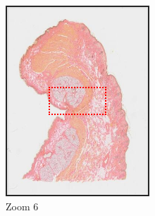 \documentclass[a4paper,11pt]{report}
\numberwithin{figure}{chapter} %
\begin{document}
\begin{itemize}
\begin{figure}[H]
            \begin{subfigure}[b]{0.3\textwidth}
            \includegraphics[width=\textwidth]{images/zooms4.png}
            \caption{Zoom 6}
            \end{subfigure}
            \begin{subfigure}[b]{0.3\textwidth}

\end{subfigure}
\end{figure}
\end{itemize}
\end{document}
